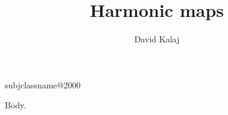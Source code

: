 \documentclass{amsart}
\makeatletter
\renewcommand*\subjclass[2][2000]{\def\@subjclass{#2}%
  \@xp\let\@xp\subjclassname\csname subjclassname@#1\endcsname}
\renewcommand\keywords[1]{\def\@keywords{#1}}
\makeatother
\begin{document}
\title{Harmonic maps}\author{David Kalaj}
\subjclass{Primary 31B05; Secondary 42B30}
\keywords{Harmonic mappings, Schwarz lemma}
\maketitle
Body.
\end{document}
